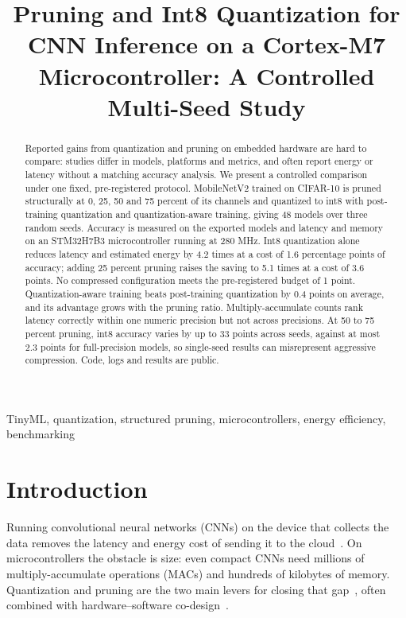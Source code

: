 \documentclass[conference]{IEEEtran}
\begin{document}
\title{Pruning and Int8 Quantization for CNN Inference on a Cortex-M7 Microcontroller: A Controlled Multi-Seed Study}

\author{
}

\maketitle

\begin{abstract}
Reported gains from quantization and pruning on embedded hardware are hard to compare: studies differ in models, platforms and metrics, and often report energy or latency without a matching accuracy analysis. We present a controlled comparison under one fixed, pre-registered protocol. MobileNetV2 trained on CIFAR-10 is pruned structurally at 0, 25, 50 and 75 percent of its channels and quantized to int8 with post-training quantization and quantization-aware training, giving 48 models over three random seeds. Accuracy is measured on the exported models and latency and memory on an STM32H7B3 microcontroller running at 280 MHz. Int8 quantization alone reduces latency and estimated energy by 4.2 times at a cost of 1.6 percentage points of accuracy; adding 25 percent pruning raises the saving to 5.1 times at a cost of 3.6 points. No compressed configuration meets the pre-registered budget of 1 point. Quantization-aware training beats post-training quantization by 0.4 points on average, and its advantage grows with the pruning ratio. Multiply-accumulate counts rank latency correctly within one numeric precision but not across precisions. At 50 to 75 percent pruning, int8 accuracy varies by up to 33 points across seeds, against at most 2.3 points for full-precision models, so single-seed results can misrepresent aggressive compression. Code, logs and results are public.
\end{abstract}

\begin{IEEEkeywords}
TinyML, quantization, structured pruning, microcontrollers, energy efficiency, benchmarking
\end{IEEEkeywords}

\section{Introduction}
Running convolutional neural networks (CNNs) on the device that collects the data removes the latency and energy cost of sending it to the cloud~\cite{verhelst2020edge}. On microcontrollers the obstacle is size: even compact CNNs need millions of multiply-accumulate operations (MACs) and hundreds of kilobytes of memory. Quantization and pruning are the two main levers for closing that gap~\cite{han2016deep,jacob2018quantization}, often combined with hardware--software co-design~\cite{chen2017eyeriss,hao2020codesign,yang2019synetgy}.
\end{document}
